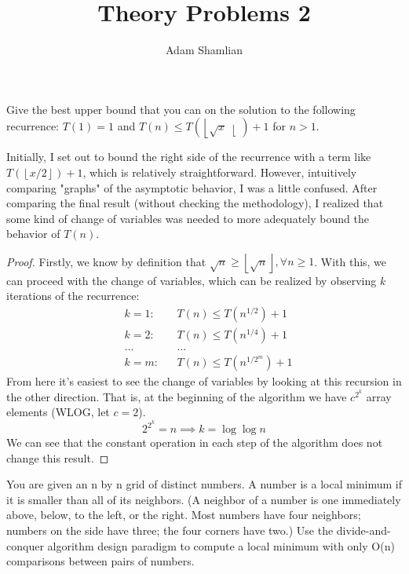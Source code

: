 \documentclass[12pt]{article}
\newenvironment{problem}[2][Problem]{\begin{trivlist}
\item[\hskip \labelsep {\bfseries #1}\hskip \labelsep {\bfseries #2.}]}{\end{trivlist}}
\begin{document}
 
 
\title{Theory Problems 2}
\author{Adam Shamlian}
\maketitle
 
\begin{problem}{1}
Give the best upper bound that you can on the solution to the following recurrence: $T(1) = 1$ and $T(n) \leq T(\left\lfloor{\sqrt{x}}\right\lfloor) + 1$ for $n > 1$.
\end{problem}

Initially, I set out to bound the right side of the recurrence with a term like $T(\left\lfloor{x/2}\right\rfloor) + 1$, which is relatively straightforward. However, intuitively comparing "graphs" of the asymptotic behavior, I was a little confused. After comparing the final result (without checking the methodology), I realized that some kind of change of variables was needed to more adequately bound the behavior of $T(n)$. 

\begin{proof}
Firstly, we know by definition that $\sqrt{n} \geq \left\lfloor\sqrt{n}\right\rfloor, \forall n \geq 1$. With this, we can proceed with the change of variables, which can be realized by observing $k$ iterations of the recurrence:
\begin{align*}
&k = 1:& &T(n) \leq T(n^{1/2}) + 1 \\
&k = 2:& &T(n) \leq T(n^{1/4}) + 1 \\
&...   & &... \\
&k = m:& &T(n) \leq T(n^{1/2^m}) + 1
\end{align*}
From here it's easiest to see the change of variables by looking at this recursion in the other direction. That is, at the beginning of the algorithm we have $c^{2^k}$ array elements (WLOG, let $c = 2$). 
\begin{equation}
2^{2^k} = n \implies k = \log{\log{n}}
\end{equation}
We can see that the constant operation in each step of the algorithm does not change this result.
\end{proof}


\begin{problem}{2}
You are given an n by n grid of distinct numbers. A number is a local minimum if it is smaller than all of its neighbors. (A neighbor of a number is one immediately above, below, to the left, or the right. Most numbers have four neighbors; numbers on the side have three; the four corners have two.) Use the divide-and-conquer algorithm design paradigm to compute a local minimum with only O(n) comparisons between pairs of numbers.
\end{problem}
\end{document}
